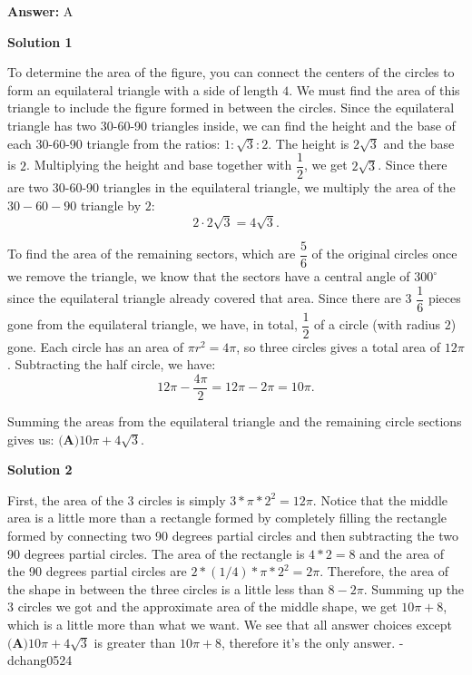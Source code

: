 \begin{enumerate}
 \textbf{Answer: }A



\textbf{Solution 1}

To determine the area of the figure, you can connect the centers of the circles to form an equilateral triangle with a side of length $4$. We must find the area of this triangle to include the figure formed in between the circles. Since the equilateral triangle has two 30-60-90 triangles inside, we can find the height and the base of each 30-60-90 triangle from the ratios: $1: \sqrt{3}: 2.$ The height is $2\sqrt{3}$ and the base is $2$. Multiplying the height and base together with $\dfrac{1}{2}$, we get $2\sqrt{3}$. Since there are two 30-60-90 triangles in the equilateral triangle, we multiply the area of the $30-60-90$ triangle by $2$: 
 \[2\cdot 2\sqrt{3} = 4\sqrt{3}.\]

 To find the area of the remaining sectors, which are $\dfrac{5}{6}$ of the original circles once we remove the triangle, we know that the sectors have a central angle of $300^\circ$ since the equilateral triangle already covered that area. Since there are $3$ $\dfrac{1}{6}$ pieces gone from the equilateral triangle, we have, in total, $\dfrac{1}{2}$ of a circle (with radius $2$) gone. Each circle has an area of $\pi r^2 = 4\pi$, so three circles gives a total area of $12\pi$. Subtracting the half circle, we have: 
 \[12\pi - \dfrac{4\pi}{2} = 12\pi - 2\pi = 10\pi.\] 

 Summing the areas from the equilateral triangle and the remaining circle sections gives us: $\boxed{\textbf{(A)} 10\pi + 4\sqrt3}$.

 



\textbf{Solution 2}

First, the area of the 3 circles is simply $3*\pi*2^2 = 12 \pi$. Notice that the middle area is a little more than a rectangle formed by completely filling the rectangle formed by connecting two 90 degrees partial circles and then subtracting the two 90 degrees partial circles. The area of the rectangle is $4*2=8$ and the area of the 90 degrees partial circles are $2*(1/4)*\pi*2^2 = 2\pi$. Therefore, the area of the shape in between the three circles is a little less than $8 - 2\pi$. Summing up the 3 circles we got and the approximate area of the middle shape, we get $10\pi+8$, which is a little more than what we want. We see that all answer choices except $\boxed{\textbf{(A)} 10\pi + 4\sqrt3}$ is greater than $10\pi+8$, therefore it's the only answer. -dchang0524


\end{enumerate}
